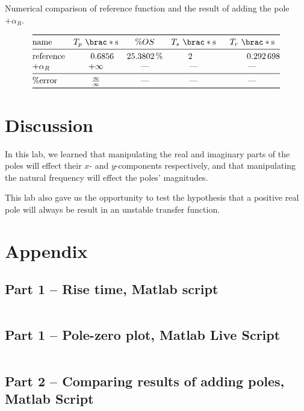 \documentclass[12pt]{article}
\DeclarePairedDelimiter\brac[]%
\begin{document}
\begin{table}[]
    \centering
    \caption{Numerical comparison of reference function and the result of adding the pole $+\alpha_R$.}
    \[
        \begin{array}{@{}>$l<$SSSS@{}}
        \toprule
            name &
            T_p\ \brac*{\si\second}
                & \%OS
                & T_s\ \brac*{\si\second}
                & T_r\ \brac*{\si\second}
        \\*
        \midrule
            reference &
            0.6856 & \SI{25.3802}\percent & 2 & 0.292 698
        \\*
            $+\alpha_R$ &
            \text{$+\infty$} & \text{---} & \text{---} & \text{---}
        \\*
        \midrule
            \%error &
            \frac\infty\infty
                & \text{---}
                & \text{---}
                & \text{---}
        \\*
        \bottomrule
        \end{array}
    \]
    \label{tab:positive real poles}
\end{table}

\section{Discussion}

In this lab, we learned that manipulating the real and imaginary parts of the poles will effect their $x$- and $y$-components respectively, and that manipulating the natural frequency will effect the poles' magnitudes.

This lab also gave us the opportunity to test the hypothesis that a positive real pole will always be result in an unstable transfer function.

\newpage
\printbibliography

\newpage
\appendix
\section{Appendix}

\subsection{Part 1 -- Rise time, Matlab script}\label{sap:solving for .9cf and .1cf}
\inputminted{matlab}{src/part01a_rise_time.m}

\subsection{Part 1 -- Pole-zero plot, Matlab Live Script}\label{sap:pzplot}
\inputminted{matlab}{src/part01a_pzplot_mlx.m}

\subsection{Part 2 -- Comparing results of adding poles, Matlab Script}\label{sap:adding poles}
\inputminted{matlab}{src/part02_adding_poles.m}
\end{document}

